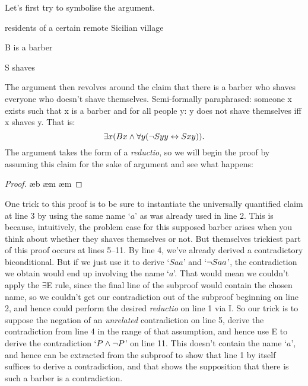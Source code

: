 Let's first try to symbolise the argument. \begin{ekey}
	\item[\text{Domain}] residents of a certain remote Sicilian village
	\item[B] is a barber
	\item[S] shaves 
\end{ekey}
The argument then revolves around the claim that there is a barber who shaves everyone who doesn't shave themselves. Semi-formally paraphrased: someone x exists such that x is a barber and for all people y: y does not shave themselves iff x shaves y. That is: $$\exists x (Bx \wedge \forall y (\neg Syy \leftrightarrow Sxy)).$$ The argument takes the form of a \emph{reductio}, so we will begin the proof by assuming this claim for the sake of argument and see what happens: \begin{proof}
	\open
	\open
	\ae{b}
	\open
		\open 
		\close
		\close
	\close
	\ae{m}
	\ae{m}
	\close
\end{proof}
One trick to this proof is to be sure to instantiate the universally quantified claim at line 3 by using the same name `$a$' as was already used in line 2. This is because, intuitively, the problem case for this supposed barber arises when you think about whether they shaves themselves or not. But themselves trickiest part of this proof occurs at lines 5–11. By line 4, we've already derived a contradictory biconditional. But if we just use it to derive `$Saa$' and `$\neg Saa$', the contradiction we obtain would end up involving the name `$a$'. That would mean we couldn't apply the $\exists$E rule, since the final line of the subproof would contain the chosen name, so we couldn't get our contradiction out of the subproof beginning on line 2, and hence could perform the desired \emph{reductio} on line 1 via {\enot}I. So our trick is to suppose the negation of an \emph{unrelated} contradiction on line 5, derive the contradiction from line 4 in the range of that assumption, and hence use {\enot}E to derive the contradiction `$P \wedge \neg P$' on line 11. This doesn't contain the name `$a$', and hence can be extracted from the subproof to show that line 1 by itself suffices to derive a contradiction, and that shows the supposition that there is such a barber is a contradiction.


